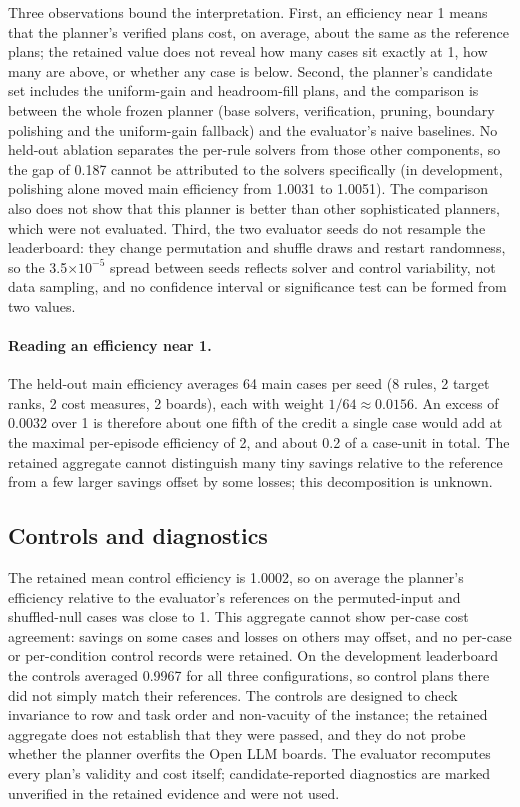 \documentclass{article}
\begin{document}
Three observations bound the interpretation. First, an efficiency near 1 means that the planner's verified plans cost, on average, about the same as the reference plans; the retained value does not reveal how many cases sit exactly at 1, how many are above, or whether any case is below. Second, the planner's candidate set includes the uniform-gain and headroom-fill plans, and the comparison is between the whole frozen planner (base solvers, verification, pruning, boundary polishing and the uniform-gain fallback) and the evaluator's naive baselines. No held-out ablation separates the per-rule solvers from those other components, so the gap of 0.187 cannot be attributed to the solvers specifically (in development, polishing alone moved main efficiency from 1.0031 to 1.0051). The comparison also does not show that this planner is better than other sophisticated planners, which were not evaluated. Third, the two evaluator seeds do not resample the leaderboard: they change permutation and shuffle draws and restart randomness, so the 3.5$\times10^{-5}$ spread between seeds reflects solver and control variability, not data sampling, and no confidence interval or significance test can be formed from two values.

\paragraph{Reading an efficiency near 1.} The held-out main efficiency averages 64 main cases per seed (8 rules, 2 target ranks, 2 cost measures, 2 boards), each with weight $1/64\approx0.0156$. An excess of 0.0032 over 1 is therefore about one fifth of the credit a single case would add at the maximal per-episode efficiency of 2, and about 0.2 of a case-unit in total. The retained aggregate cannot distinguish many tiny savings relative to the reference from a few larger savings offset by some losses; this decomposition is unknown.

\subsection{Controls and diagnostics}
The retained mean control efficiency is 1.0002, so on average the planner's efficiency relative to the evaluator's references on the permuted-input and shuffled-null cases was close to 1. This aggregate cannot show per-case cost agreement: savings on some cases and losses on others may offset, and no per-case or per-condition control records were retained. On the development leaderboard the controls averaged 0.9967 for all three configurations, so control plans there did not simply match their references. The controls are designed to check invariance to row and task order and non-vacuity of the instance; the retained aggregate does not establish that they were passed, and they do not probe whether the planner overfits the Open LLM boards. The evaluator recomputes every plan's validity and cost itself; candidate-reported diagnostics are marked unverified in the retained evidence and were not used.
\end{document}
